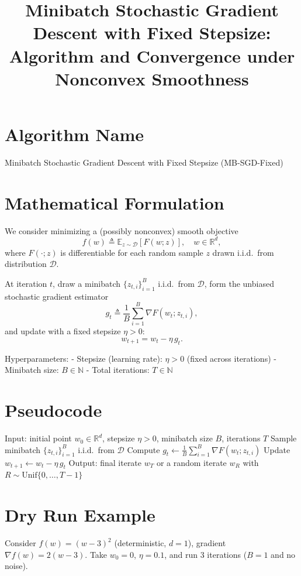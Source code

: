 \documentclass[11pt]{article}
\newcommand{\R}{\mathbb{R}}
\begin{document}
\title{Minibatch Stochastic Gradient Descent with Fixed Stepsize: Algorithm and Convergence under Nonconvex Smoothness}
\author{}
\date{}
\maketitle

\section*{Algorithm Name}
Minibatch Stochastic Gradient Descent with Fixed Stepsize (MB-SGD-Fixed)

\section*{Mathematical Formulation}
We consider minimizing a (possibly nonconvex) smooth objective
\[
f(w) \triangleq \mathbb{E}_{z\sim\mathcal{D}}[F(w;z)], \quad w\in\R^d,
\]
where $F(\cdot;z)$ is differentiable for each random sample $z$ drawn i.i.d.\ from distribution $\mathcal{D}$.

At iteration $t$, draw a minibatch $\{z_{t,i}\}_{i=1}^B$ i.i.d.\ from $\mathcal{D}$, form the unbiased stochastic gradient estimator
\[
g_t \triangleq \frac{1}{B}\sum_{i=1}^B \nabla F(w_t; z_{t,i}),
\]
and update with a fixed stepsize $\eta>0$:
\[
w_{t+1} = w_t - \eta\, g_t.
\]

Hyperparameters:
- Stepsize (learning rate): $\eta>0$ (fixed across iterations)
- Minibatch size: $B\in\mathbb{N}$
- Total iterations: $T\in\mathbb{N}$

\section*{Pseudocode}
\begin{algorithm}[H]
\caption{MB-SGD-Fixed}
\begin{algorithmic}[1]
\STATE Input: initial point $w_0\in\R^d$, stepsize $\eta>0$, minibatch size $B$, iterations $T$
  \STATE Sample minibatch $\{z_{t,i}\}_{i=1}^B$ i.i.d.\ from $\mathcal{D}$
  \STATE Compute $g_t \leftarrow \frac{1}{B}\sum_{i=1}^B \nabla F(w_t; z_{t,i})$
  \STATE Update $w_{t+1} \leftarrow w_t - \eta\, g_t$
\ENDFOR
\STATE Output: final iterate $w_T$ or a random iterate $w_R$ with $R\sim\text{Unif}\{0,\dots,T-1\}$
\end{algorithmic}
\end{algorithm}

\section*{Dry Run Example}
Consider $f(w)=(w-3)^2$ (deterministic, $d=1$), gradient $\nabla f(w)=2(w-3)$. Take $w_0=0$, $\eta=0.1$, and run 3 iterations ($B=1$ and no noise).
\end{document}
